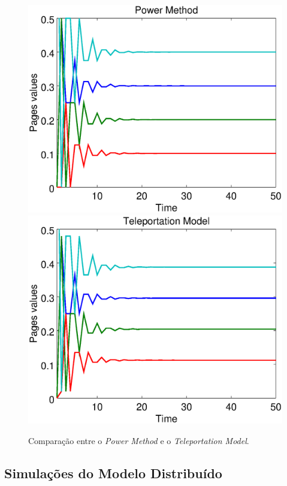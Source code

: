 \documentclass[a4paper]{report} %
\begin{document}
\
\begin{figure}[!htb]
	\centering
	\includegraphics[scale=0.3]{imagens/powermethod}
	\hspace{0.1cm}
	\includegraphics[scale=0.3]{imagens/teleportation}
	\caption{Comparação entre o \textit{Power Method} e o \textit{Teleportation Model}.}
	\label{powertele}
\end{figure}

\subsection*{Simulações do Modelo Distribuído}
\end{document}
